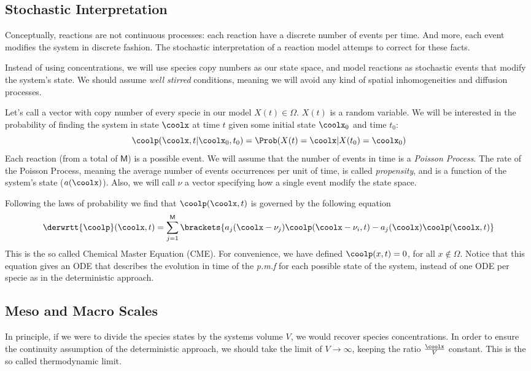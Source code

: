 \documentclass[letterpaper]{article}
\begin{document}
\subsection{Stochastic Interpretation}

Conceptually, reactions are not continuous processes: each reaction
have a discrete number of events per time. And more, each event
modifies the system in discrete fashion. The stochastic interpretation
of a reaction model attemps to correct for these facts.

Instead of using concentrations, we will use species copy
numbers as our state space, and model reactions as stochastic events
that modify the system's state. We should assume \emph{well stirred}
conditions, meaning we will avoid any kind of spatial inhomogeneities
and diffusion processes. 

Let's call a vector with copy number of every specie in our model
$X(t) \in \Omega$. $X(t)$ is a random variable. We will be interested
in the probability of finding the system in state $\coolx$ at time $t$
given some initial state $\coolx_0$ and time $t_0$:
$$\coolp(\coolx,t|\coolx_0,t_0) = \Prob(X(t) = \coolx|X(t_0) = \coolx_0)$$
Each reaction (from a total of $\mathsf{M}$) is a possible event. We
will assume that the number of events in time is a \emph{Poisson
  Process}. The rate of the Poisson Process, meaning the average
number of events occurrences per unit of time, is called
\emph{propensity}, and is a function of the system's state
($a(\coolx)$).  Also, we will call $\nu$ a vector specifying how a
single event modify the state space.

Following the laws of probability we find that $\coolp(\coolx,t)$ is
governed by the following equation
$$\derwrtt{\coolp}(\coolx,t) = \sum_{j=1}^{\mathsf{M}} \brackets{a_j(\coolx - \nu_j)\coolp(\coolx - \nu_i,t) - a_j(\coolx)\coolp(\coolx,t)}$$
This is the so called Chemical Master Equation (CME). For convenience,
we have defined $\coolp(x,t)=0$, for all $x \notin \Omega$. Notice
that this equation gives an ODE that describes the evolution in time
of the \emph{p.m.f} for each possible state of the system, instead of
one ODE per specie as in the deterministic approach.

\subsection{Meso and Macro Scales}

In principle, if we were to divide the species states by the systems
volume $V$, we would recover species concentrations. In order to
ensure the continuity assumption of the deterministic approach, we
should take the limit of $V \to \infty$, keeping the ratio
$\frac{\coolx}{V}$ constant. This is the so called thermodynamic limit.
\end{document}
